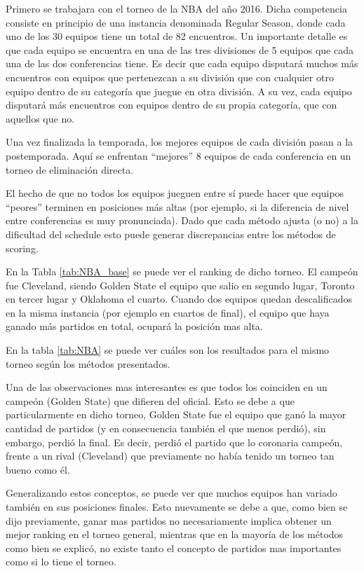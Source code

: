 \documentclass[a4paper]{article}
\begin{document}
Primero se trabajara con el torneo de la NBA del año 2016. Dicha competencia consiste en principio de una instancia denominada Regular Season, donde cada uno de los 30 equipos tiene un total de 82 encuentros. Un importante detalle es que cada equipo se encuentra en una de las tres divisiones de 5 equipos que cada una de las dos conferencias tiene. Es decir que cada equipo disputará muchos más encuentros con equipos que pertenezcan a su división que con cualquier otro equipo dentro de su categoría que juegue en otra división. A su vez, cada equipo disputará más encuentros con equipos dentro de su propia categoría, que con aquellos que no.

Una vez finalizada la temporada, los mejores equipos de cada división pasan a la postemporada. Aquí se enfrentan ``mejores'' 8 equipos de cada conferencia en un torneo de eliminación directa.

El hecho de que no todos los equipos jueguen entre sí puede hacer que equipos ``peores'' terminen en posiciones más altas (por ejemplo, si la diferencia de nivel entre conferencias es muy pronunciada). Dado que cada método ajusta (o no) a la dificultad del schedule esto puede generar discrepancias entre los métodos de scoring.

En la Tabla \ref{tab:NBA_base} se puede ver el ranking de dicho torneo. El campeón fue Cleveland, siendo Golden State el equipo que salio en segundo lugar, Toronto en tercer lugar y Oklahoma el cuarto. Cuando dos equipos quedan descalificados en la misma instancia (por ejemplo en cuartos de final), el equipo que haya ganado más partidos en total, ocupará la posición mas alta.

En la tabla \ref{tab:NBA} se puede ver cuáles son los resultados para el mismo torneo según los métodos presentados.

Una de las observaciones mas interesantes es que todos los coinciden en un campeón (Golden State) que difieren del oficial. Esto se debe a que particularmente en dicho torneo, Golden State fue el equipo que ganó la mayor cantidad de partidos (y en consecuencia también el que menos perdió), sin embargo, perdió la final. Es decir, perdió el partido que lo coronaria campeón, frente a un rival (Cleveland) que previamente no había tenido un torneo tan bueno como él.

Generalizando estos conceptos, se puede ver que muchos equipos han variado también en sus posiciones finales. Esto nuevamente se debe a que, como bien se dijo previamente, ganar mas partidos no necesariamente implica obtener un mejor ranking en el torneo general, mientras que en la mayoría de los métodos como bien se explicó, no existe tanto el concepto de partidos mas importantes como si lo tiene el torneo.
\newpage
\end{document}
